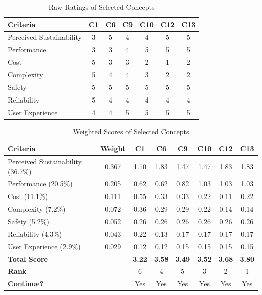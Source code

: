\documentclass[12pt]{article}
\begin{document}
\begin{table}[h!]
\centering
\caption{Raw Ratings of Selected Concepts}
\label{tab:revised_raw_ratings}
\begin{tabular}{l c c c c c c}
\toprule
\textbf{Criteria} & \textbf{C1} & \textbf{C6} & \textbf{C9} & \textbf{C10} & \textbf{C12} & \textbf{C13} \\
\midrule
Perceived Sustainability & 3 & 5 & 4 & 4 & 5 & 5 \\
Performance              & 3 & 3 & 4 & 5 & 5 & 5 \\
Cost                     & 5 & 3 & 3 & 2 & 1 & 2 \\
Complexity               & 5 & 4 & 4 & 3 & 2 & 2 \\
Safety                   & 5 & 5 & 5 & 5 & 5 & 5 \\
Reliability              & 5 & 4 & 4 & 4 & 4 & 4 \\
User Experience          & 4 & 4 & 5 & 5 & 5 & 5 \\
\bottomrule
\end{tabular}
\end{table}

\begin{table}[h!]
\centering
\caption{Weighted Scores of Selected Concepts}
\label{tab:revised_weighted_scores}
\begin{tabular}{l c c c c c c c}
\toprule
\textbf{Criteria} & \textbf{Weight} & \textbf{C1} & \textbf{C6} & \textbf{C9} & \textbf{C10} & \textbf{C12} & \textbf{C13} \\
\midrule
Perceived Sustainability (36.7\%) & 0.367 & 1.10 & 1.83 & 1.47 & 1.47 & 1.83 & 1.83 \\
Performance (20.5\%)              & 0.205 & 0.62 & 0.62 & 0.82 & 1.03 & 1.03 & 1.03 \\
Cost (11.1\%)                     & 0.111 & 0.55 & 0.33 & 0.33 & 0.22 & 0.11 & 0.22 \\
Complexity (7.2\%)                & 0.072 & 0.36 & 0.29 & 0.29 & 0.22 & 0.14 & 0.14 \\
Safety (5.2\%)                    & 0.052 & 0.26 & 0.26 & 0.26 & 0.26 & 0.26 & 0.26 \\
Reliability (4.3\%)               & 0.043 & 0.22 & 0.13 & 0.17 & 0.17 & 0.17 & 0.17 \\
User Experience (2.9\%)           & 0.029 & 0.12 & 0.12 & 0.15 & 0.15 & 0.15 & 0.15 \\
\midrule
\textbf{Total Score}              &       & \textbf{3.22} & \textbf{3.58} & \textbf{3.49} & \textbf{3.52} & \textbf{3.68} & \textbf{3.80} \\
\textbf{Rank}                     &       & 6 & 4 & 5 & 3 & 2 & 1 \\
\textbf{Continue?}                &       & Yes & Yes & Yes & Yes & Yes & Yes \\
\bottomrule
\end{tabular}
\end{table}
\end{document}
